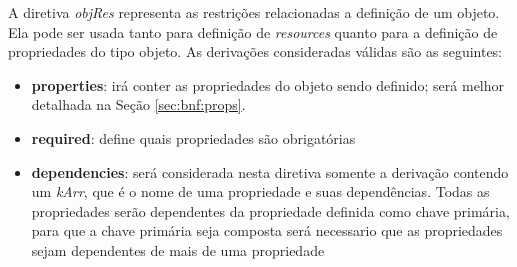 
\label{sec:bnf:obj}
A diretiva \textit{objRes} representa as restrições relacionadas a definição de um objeto. Ela pode ser usada tanto para definição de \textit{resources} quanto para a definição de propriedades do tipo objeto. As derivações consideradas válidas são as seguintes:

\begin{itemize}
    \item \textbf{properties}: irá conter as propriedades do objeto sendo definido; será melhor detalhada na Seção \ref{sec:bnf:props}.


    \item \textbf{required}: define quais propriedades são obrigatórias

    \item \textbf{dependencies}: será considerada nesta diretiva somente a derivação contendo um \textit{kArr}, que é o nome de uma propriedade e suas dependências. Todas as propriedades serão dependentes da propriedade definida como chave primária, para que a chave primária seja composta será necessario que as propriedades sejam dependentes de mais de uma propriedade
\end{itemize}


